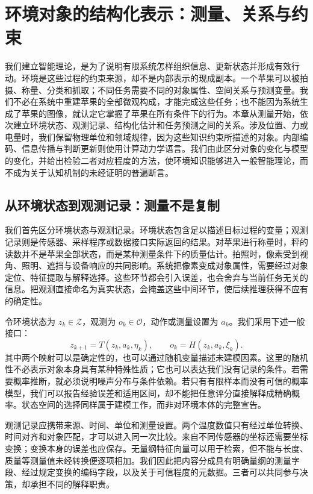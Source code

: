 \chapter{环境对象的结构化表示：测量、关系与约束}
\label{chp:physics_anatomy}

我们建立智能理论，是为了说明有限系统怎样组织信息、更新状态并形成有效行动。环境是这些过程的约束来源，却不是内部表示的现成副本。一个苹果可以被拍摄、称量、分类和抓取；不同任务需要不同的对象属性、空间关系与预测变量。我们不必在系统中重建苹果的全部微观构成，才能完成这些任务；也不能因为系统生成了苹果的图像，就认定它掌握了苹果在所有条件下的行为。本章从测量开始，依次建立环境状态、观测记录、结构化估计和任务预测之间的关系。涉及位置、力或电量时，我们保留物理单位和领域规律，因为这些知识约束所描述的对象。内部编码、信息传播与判断更新则使用计算动力学语言。我们由此区分对象的变化与模型的变化，并给出检验二者对应程度的方法，使环境知识能够进入一般智能理论，而不成为关于认知机制的未经证明的普遍断言。

\section{从环境状态到观测记录：测量不是复制}
\label{sec:general_relativity}

我们首先区分环境状态与观测记录。环境状态包含足以描述目标过程的变量；观测记录则是传感器、采样程序或数据接口实际返回的结果。对苹果进行称量时，秤的读数并不是苹果全部状态，而是某种测量条件下的质量估计。拍照时，像素受到视角、照明、遮挡与设备响应的共同影响。系统把像素变成对象属性，需要经过对象定位、特征提取与解释选择。这些环节都会引入误差，也会舍弃与当前任务无关的信息。把观测直接命名为真实状态，会掩盖这些中间环节，使后续推理获得不应有的确定性。

令环境状态为 $z_k\in\mathcal Z$，观测为 $o_k\in\mathcal O$，动作或测量设置为 $a_k$。我们采用下述一般接口：
\begin{equation}
z_{k+1}=T(z_k,a_k,\eta_k),\qquad o_k=H(z_k,a_k,\xi_k).
\end{equation}
其中两个映射可以是确定性的，也可以通过随机变量描述未建模因素。这里的随机性不必表示对象本身具有某种特殊性质；它也可以表达我们没有记录的条件。若需要概率推断，就必须说明噪声分布与条件依赖。若只有有限样本而没有可信的概率模型，我们可以报告经验误差和适用区间，却不能把任意评分直接解释成精确概率。状态空间的选择同样属于建模工作，而非对环境本体的完整宣告。

观测记录应携带来源、时间、单位和测量设置。两个温度数值只有经过单位转换、时间对齐和对象匹配，才可以进入同一次比较。来自不同传感器的坐标还需要坐标变换；变换本身的误差也应保存。无量纲特征向量可以用于检索，但不能与长度、质量等测量值未经转换便逐项相加。我们因此把内容分成具有明确量纲的测量字段、经过规定变换的编码字段，以及关于可信程度的元数据。三者可以共同参与决策，却承担不同的解释职责。

